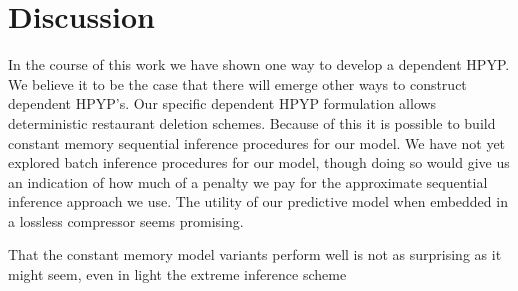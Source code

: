 \section{Discussion}
\label{discussion}

In the course of this work we have shown one way to develop a dependent HPYP.  We believe it to be the case that there will emerge other ways to construct dependent HPYP's.  Our specific dependent HPYP formulation allows deterministic restaurant deletion schemes.  Because of this it is possible to build constant memory sequential inference procedures for our model.  We have not yet explored batch inference procedures for our model, though doing so would give us an indication of how much of a penalty we pay for the approximate sequential inference approach we use.  The utility of our predictive model when embedded in a lossless compressor seems promising.

That the constant memory model variants perform well is not as surprising as it might seem, even in light the extreme inference scheme

